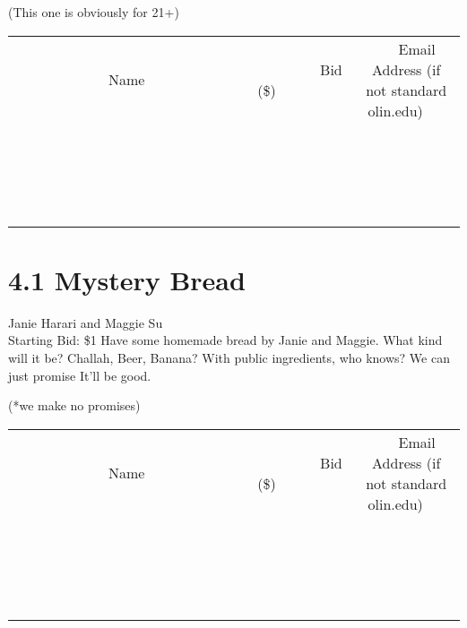 \documentclass[11pt]{article}
\begin{document}
(This one is obviously for 21+)
\\[3ex]
\begin{tabular}{c c c}
~~~~~~~~~~~~~Name~~~~~~~~~~~~~ & ~~~~~~~~~Bid (\$)~~~~~~~~~  & ~~~Email Address (if not standard olin.edu)~~~\\
 & & \\
\hline
 & & \\
\hline
 & & \\
\hline
 & & \\
\hline
 & & \\
\hline
 & & \\
\hline
 & & \\
\hline
 & & \\
\hline
 & & \\
\hline
 & & \\
\hline
 & & \\
\hline
 & & \\
\hline
 & & \\
\hline
 & & \\
\hline
 & & \\
\hline
 & & \\
\hline
 & & \\
\hline
 & & \\
\hline
 & & \\
\hline
\end{tabular}
\newpage
\section*{4.1 Mystery Bread}
Janie Harari and Maggie Su
\\
Starting Bid: \$1
\newline
Have some homemade bread by Janie and Maggie.  What kind will it be? Challah, Beer, Banana? With public ingredients, who knows?  We can just promise It'll be good.

(*we make no promises)
\\[3ex]
\begin{tabular}{c c c}
~~~~~~~~~~~~~Name~~~~~~~~~~~~~ & ~~~~~~~~~Bid (\$)~~~~~~~~~  & ~~~Email Address (if not standard olin.edu)~~~\\
 & & \\
\hline
 & & \\
\hline
 & & \\
\hline
 & & \\
\hline
 & & \\
\hline
 & & \\
\hline
 & & \\
\hline
 & & \\
\hline
 & & \\
\hline
 & & \\
\hline
 & & \\
\hline
 & & \\
\hline
 & & \\
\hline
 & & \\
\hline
 & & \\
\hline
 & & \\
\hline
 & & \\
\hline
 & & \\
\hline
 & & \\
\hline
\end{tabular}
\newpage
\end{document}
